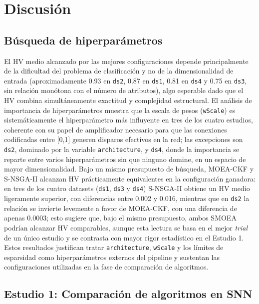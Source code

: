 \chapter{Discusión}

\section{Búsqueda de hiperparámetros}

El HV medio alcanzado por las mejores configuraciones depende principalmente de la dificultad del problema de clasificación y no de la dimensionalidad de entrada (aproximadamente 0.93 en \texttt{ds2}, 0.87 en \texttt{ds1}, 0.81 en \texttt{ds4} y 0.75 en \texttt{ds3}, sin relación monótona con el número de atributos), algo esperable dado que el HV combina simultáneamente exactitud y complejidad estructural. El análisis de importancia de hiperparámetros muestra que la escala de pesos (\texttt{wScale}) es sistemáticamente el hiperparámetro más influyente en tres de los cuatro estudios, coherente con su papel de amplificador necesario para que las conexiones codificadas entre [0,1] generen disparos efectivos en la red; las excepciones son \texttt{ds2}, dominado por la variable \texttt{architecture}, y \texttt{ds4}, donde la importancia se reparte entre varios hiperparámetros sin que ninguno domine, en un espacio de mayor dimensionalidad. Bajo un mismo presupuesto de búsqueda, MOEA-CKF y S-NSGA-II alcanzan HV prácticamente equivalentes en la configuración ganadora: en tres de los cuatro datasets (\texttt{ds1}, \texttt{ds3} y \texttt{ds4}) S-NSGA-II obtiene un HV medio ligeramente superior, con diferencias entre 0.002 y 0.016, mientras que en \texttt{ds2} la relación se invierte levemente a favor de MOEA-CKF, con una diferencia de apenas 0.0003; esto sugiere que, bajo el mismo presupuesto, ambos SMOEA podrían alcanzar HV comparables, aunque esta lectura se basa en el mejor \emph{trial} de un único estudio y se contrasta con mayor rigor estadístico en el Estudio 1. Estos resultados justifican tratar \texttt{architecture}, \texttt{wScale} y los límites de esparsidad como hiperparámetros externos del pipeline y sustentan las configuraciones utilizadas en la fase de comparación de algoritmos.

\section{Estudio 1: Comparación de algoritmos en SNN}
\label{sec:discusion-estudio1}


